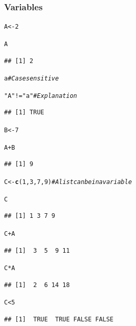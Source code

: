 \documentclass{beamer}\usepackage[]{graphicx}\usepackage[]{color}
\makeatletter
\newcommand{\hlnum}[1]{\textcolor[rgb]{0.686,0.059,0.569}{#1}}%
\newcommand{\hlstr}[1]{\textcolor[rgb]{0.192,0.494,0.8}{#1}}%
\newcommand{\hlcom}[1]{\textcolor[rgb]{0.678,0.584,0.686}{\textit{#1}}}%
\newcommand{\hlopt}[1]{\textcolor[rgb]{0,0,0}{#1}}%
\newcommand{\hlstd}[1]{\textcolor[rgb]{0.345,0.345,0.345}{#1}}%
\newcommand{\hlkwb}[1]{\textcolor[rgb]{0.69,0.353,0.396}{#1}}%
\newcommand{\hlkwd}[1]{\textcolor[rgb]{0.737,0.353,0.396}{\textbf{#1}}}%
\newenvironment{kframe}{%
 \def\at@end@of@kframe{}%
 \ifinner\ifhmode%
  \def\at@end@of@kframe{\end{minipage}}%
  \begin{minipage}{\columnwidth}%
 \fi\fi%
 \def\FrameCommand##1{\hskip\@totalleftmargin \hskip-\fboxsep
 \colorbox{shadecolor}{##1}\hskip-\fboxsep
     \hskip-\linewidth \hskip-\@totalleftmargin \hskip\columnwidth}%
 \MakeFramed {\advance\hsize-\width
   \@totalleftmargin\z@ \linewidth\hsize
   \@setminipage}}%
 {\par\unskip\endMakeFramed%
 \at@end@of@kframe}
\newenvironment{knitrout}{}{} %
\makeatother
\begin{document}
\begin{frame}
\frametitle{Variables}

\begin{knitrout}\scriptsize
{}\color{fgcolor}\begin{kframe}
\begin{alltt}
\hlstd{A} \hlkwb{<-} \hlnum{2}

\hlstd{A}
\end{alltt}
\begin{verbatim}
## [1] 2
\end{verbatim}
\begin{alltt}
\hlstd{a}  \hlcom{# Case sensitive}
\end{alltt}


{\ttfamily\noindent\bfseries\color{errorcolor}{\#\# Error in eval(expr, envir, enclos): object 'a' not found}}\begin{alltt}
\hlstr{"A"} \hlopt{!=} \hlstr{"a"}  \hlcom{# Explanation}
\end{alltt}
\begin{verbatim}
## [1] TRUE
\end{verbatim}
\begin{alltt}
\hlstd{B} \hlkwb{<-} \hlnum{7}

\hlstd{A} \hlopt{+} \hlstd{B}
\end{alltt}
\begin{verbatim}
## [1] 9
\end{verbatim}
\end{kframe}
\end{knitrout}

\begin{knitrout}\scriptsize
{}\color{fgcolor}\begin{kframe}
\begin{alltt}
\hlstd{C} \hlkwb{<-} \hlkwd{c}\hlstd{(}\hlnum{1}\hlstd{,} \hlnum{3}\hlstd{,} \hlnum{7}\hlstd{,} \hlnum{9}\hlstd{)}  \hlcom{# A list can be in a variable}

\hlstd{C}
\end{alltt}
\begin{verbatim}
## [1] 1 3 7 9
\end{verbatim}
\begin{alltt}
\hlstd{C} \hlopt{+} \hlstd{A}
\end{alltt}
\begin{verbatim}
## [1]  3  5  9 11
\end{verbatim}
\begin{alltt}
\hlstd{C} \hlopt{*} \hlstd{A}
\end{alltt}
\begin{verbatim}
## [1]  2  6 14 18
\end{verbatim}
\begin{alltt}
\hlstd{C} \hlopt{<} \hlnum{5}
\end{alltt}
\begin{verbatim}
## [1]  TRUE  TRUE FALSE FALSE
\end{verbatim}
\end{kframe}
\end{knitrout}

\end{frame}
\end{document}

